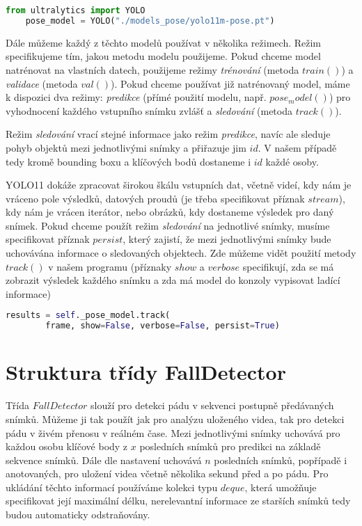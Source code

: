 \begin{lstlisting}[language=Python, label=src:params, caption={Inicializace modelu $YOLO11m-pose$}]    
    from ultralytics import YOLO    
    pose_model = YOLO("./models_pose/yolo11m-pose.pt")
\end{lstlisting}

Dále můžeme každý z těchto modelů používat v několika režimech. Režim
specifikujeme tím, jakou metodu modelu použijeme. Pokud chceme model natrénovat
na vlastních datech, použijeme režimy \textit{trénování} (metoda $train()$) a
\textit{validace} (metoda $val()$). Pokud chceme používat již natrénovaný
model, máme k dispozici dva režimy: \textit{predikce} (přímé použití modelu,
např. $pose_model()$) pro vyhodnocení každého vstupního snímku zvlášť a
\textit{sledování} (metoda $track()$).

Režim \textit{sledování} vrací stejné informace jako režim \textit{predikce},
navíc ale sleduje pohyb objektů mezi jednotlivými snímky a přiřazuje jim $id$.
V našem případě tedy kromě bounding boxu a klíčových bodů dostaneme i $id$
každé osoby.

YOLO11 dokáže zpracovat širokou škálu vstupních dat, včetně videí, kdy nám je
vráceno pole výsledků, datových proudů (je třeba specifikovat příznak
$stream$), kdy nám je vrácen iterátor, nebo obrázků, kdy dostaneme výsledek pro
daný snímek. Pokud chceme použít režim \textit{sledování} na jednotlivé snímky,
musíme specifikovat příznak $persist$, který zajistí, že mezi jednotlivými
snímky bude uchovávána informace o sledovaných objektech. Zde můžeme vidět
použití metody $track()$ v našem programu (příznaky $show$ a $verbose$
specifikují, zda se má zobrazit výsledek každého snímku a zda má model do
konzoly vypisovat ladící informace)

\begin{lstlisting}[language=Python, label=src:params, caption={Použití sledování pomocí YOLO11}]
    results = self._pose_model.track(
        frame, show=False, verbose=False, persist=True)
\end{lstlisting}

\section{Struktura třídy FallDetector}

Třída $FallDetector$ slouží pro detekci pádu v sekvenci postupně předávaných
snímků. Můžeme ji tak použít jak pro analýzu uloženého videa, tak pro detekci
pádu v živém přenosu v reálném čase. Mezi jednotlivými snímky uchovává pro
každou osobu klíčové body z $x$ posledních snímků pro predikci na základě
sekvence snímků. Dále dle nastavení uchovává $n$ posledních snímků, popřípadě i
anotovaných, pro uložení videa včetně několika sekund před a po pádu. Pro
ukládání těchto informací používáme kolekci typu $deque$, která umožňuje
specifikovat její maximální délku, nerelevantní informace ze starších snímků
tedy budou automaticky odstraňovány.

